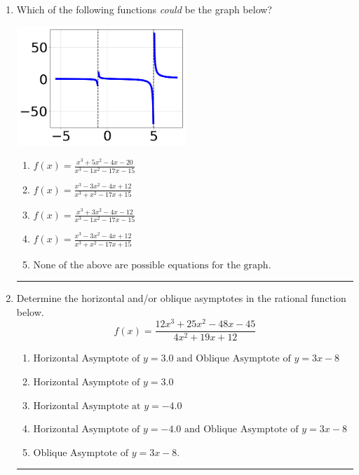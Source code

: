 \documentclass[14pt]{extbook}
\newcommand{\litem}[1]{\item#1\hspace*{-1cm}\rule{\textwidth}{0.4pt}}
\begin{document}
\begin{enumerate}
{\begin{enumerate}[label=\Alph*.]
\end{enumerate} }
\litem{
Which of the following functions \textit{could} be the graph below?
\begin{center}
    \includegraphics[width=0.5\textwidth]{../Figures/identifyGraphOfRationalFunctionA.png}
\end{center}
\begin{enumerate}[label=\Alph*.]
\item \( f(x)=\frac{x^{3} +5 x^{2} -4 x -20}{x^{3} -1 x^{2} -17 x -15} \)
\item \( f(x)=\frac{x^{3} -3 x^{2} -4 x + 12}{x^{3} + x^{2} -17 x + 15} \)
\item \( f(x)=\frac{x^{3} +3 x^{2} -4 x -12}{x^{3} -1 x^{2} -17 x -15} \)
\item \( f(x)=\frac{x^{3} -3 x^{2} -4 x + 12}{x^{3} + x^{2} -17 x + 15} \)
\item \( \text{None of the above are possible equations for the graph.} \)

\end{enumerate} }
\litem{
Determine the horizontal and/or oblique asymptotes in the rational function below.\[ f(x) = \frac{12x^{3} +25 x^{2} -48 x -45}{4x^{2} +19 x + 12} \]\begin{enumerate}[label=\Alph*.]
\item \( \text{Horizontal Asymptote of } y = 3.0 \text{ and Oblique Asymptote of } y = 3x -8 \)
\item \( \text{Horizontal Asymptote of } y = 3.0  \)
\item \( \text{Horizontal Asymptote at } y = -4.0 \)
\item \( \text{Horizontal Asymptote of } y = -4.0 \text{ and Oblique Asymptote of } y = 3x -8 \)
\item \( \text{Oblique Asymptote of } y = 3x -8. \)


\end{enumerate}}
\end{enumerate}
\end{document}
